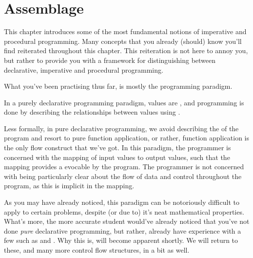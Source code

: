 \chapter{Assemblage}

%
%
%
%
%


This chapter introduces some of the most fundamental notions of imperative and
procedural programming.  Many concepts that you already (should) know you'll
find reiterated throughout this chapter.  This reiteration is not here to annoy
you, but rather to provide you with a framework for distinguishing between
declarative, imperative and procedural programming.

\vspace{0.5in}

What you've been practising thus far, is mostly the 
programming paradigm.

\begin{definition}

In a purely declarative programming paradigm, values are , and
programming is done by describing the relationships between values using
.

\end{definition}


Less formally, in pure declarative programming, we avoid describing the
 of the program and resort to pure function application, or rather,
function application is the only flow construct that we've got.  In this
paradigm, the programmer is concerned with the mapping of input values to
output values, such that the mapping provides a 
evocable by the program. The programmer is not concerned with being
particularly clear about the flow of data and control throughout the program,
as this is implicit in the mapping.


As you may have already noticed, this paradigm can be notoriously difficult to
apply to certain problems, despite (or due to) it's neat mathematical
properties.  What's more, the more accurate student would've already noticed
that you've not done \emph{pure} declarative programming, but rather, already
have experience with a few  such as  and
 . Why this is, will become apparent shortly. We
will return to these, and many more control flow structures, in a bit as well.

